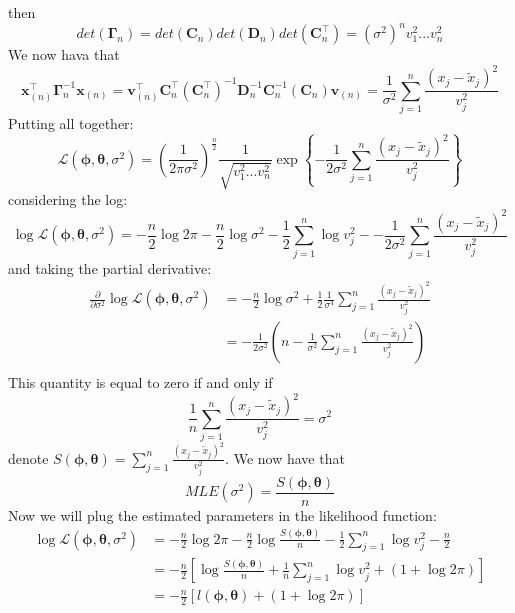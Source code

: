then
\[
    det(\boldsymbol{\Gamma}_n)=det(\boldsymbol{C}_n)det(\boldsymbol{D}_n)det(\boldsymbol{C}_n^\intercal)=(\sigma^2)^nv_1^2...v_n^2
\]
We now hava that
\[
    \boldsymbol{x}_{(n)}^\intercal\boldsymbol{\Gamma}_n^{-1}\boldsymbol{x}_{(n)}=\boldsymbol{v}_{(n)}^\intercal\boldsymbol{C}_n^\intercal(\boldsymbol{C}_n^\intercal)^{-1}\boldsymbol{D}_n^{-1}\boldsymbol{C}_n^{-1}(\boldsymbol{C}_n)\boldsymbol{v}_{(n)}=\frac{1}{\sigma^2}\sum_{j=1}^n\frac{(x_j-\tilde{x}_j)^2}{v_j^2}
\]
Putting all together:
\[
    \mathcal{L}(\boldsymbol{\phi},\boldsymbol{\theta},\sigma^2)=\left(\frac{1}{2\pi\sigma^2}\right)^{\frac{n}{2}}\frac{1}{\sqrt{v_1^2...v_n^2}}\exp\left\{-\frac{1}{2\sigma^2}\sum_{j=1}^n\frac{(x_j-\tilde{x}_j)^2}{v_j^2}\right\}
\]
considering the log:
\[
    \log\mathcal{L}(\boldsymbol{\phi},\boldsymbol{\theta},\sigma^2)=-\frac{n}{2}\log2\pi-\frac{n}{2}\log\sigma^2-\frac{1}{2}\sum_{j=1}^n\log v_j^2--\frac{1}{2\sigma^2}\sum_{j=1}^{n}\frac{(x_j-\tilde{x}_j)^2}{v_j^2}
\]
and taking the partial derivative:
\begin{equation*}
    \begin{split}
        \frac{\partial}{\partial\sigma^2}\log\mathcal{L}(\boldsymbol{\phi},\boldsymbol{\theta},\sigma^2)&=-\frac{n}{2}\log\sigma^2+\frac{1}{2}\frac{1}{\sigma^4}\sum_{j=1}^{n}\frac{(x_j-\tilde{x}_j)^2}{v_j^2}\\
        &=-\frac{1}{2\sigma^2}\left(n-\frac{1}{\sigma^2}\sum_{j=1}^{n}\frac{(x_j-\tilde{x}_j)^2}{v_j^2}\right)\\
    \end{split}
\end{equation*}
This quantity is equal to zero if and only if
\[
    \frac{1}{n}\sum_{j=1}^{n}\frac{(x_j-\tilde{x}_j)^2}{v_j^2}=\sigma^2 
\]
denote $S(\boldsymbol{\phi},\boldsymbol{\theta})=\sum_{j=1}^{n}\frac{(x_j-\tilde{x}_j)^2}{v_j^2}$. We now have that
\[
    MLE(\sigma^2)=\frac{S(\boldsymbol{\phi},\boldsymbol{\theta})}{n}  
\]
Now we will plug the estimated parameters in the likelihood function:
\begin{equation*}
    \begin{split}
        \log\mathcal{L}(\boldsymbol{\phi},\boldsymbol{\theta},\sigma^2)&=-\frac{n}{2}\log2\pi-\frac{n}{2}\log\frac{S(\boldsymbol{\phi},\boldsymbol{\theta})}{n}-\frac{1}{2}\sum_{j=1}^n\log v_j^2-\frac{n}{2}\\
        &=-\frac{n}{2}\left[\log\frac{S(\boldsymbol{\phi},\boldsymbol{\theta})}{n}+\frac{1}{n}\sum_{j=1}^n\log v_j^2+(1+\log2\pi)\right]\\
        &=-\frac{n}{2}\left[l(\boldsymbol{\phi},\boldsymbol{\theta})+(1+\log2\pi)\right]\\
    \end{split}
\end{equation*}
